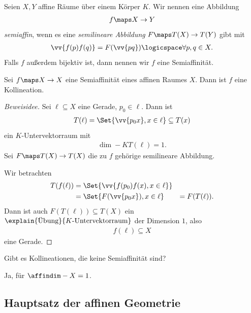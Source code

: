 \begin{definition*}
    Seien \( X,Y \) affine Räume über einem Körper \( K \). Wir nennen eine Abbildung
    \begin{align*}
        f\maps X\to Y
    \end{align*}
    \emph{semiaffin}, wenn es eine \emph{semilineare Abbildung} \( F\maps T(X)\to T(Y) \) gibt mit
    \begin{align*}
        \vv{f(p) f(q)}=F(\vv{pq})\logicspace \forall p,q\in X.
    \end{align*}
    Falls \( f \) außerdem bijektiv ist, dann nennen wir \( f \) eine Semiaffinität.
\end{definition*}
\begin{lemma}
    Sei \( f\maps X\to X \) eine Semiaffinität eines affinen Raumes \( X \). Dann ist \( f \) eine Kollineation.
\end{lemma}
\begin{proof}[Beweisidee]
    Sei \( \ell \subseteq X \) eine Gerade, \( p_0\in \ell \). Dann ist
    \begin{align*}
        T(\ell)=\Set{\vv{p_0 x}, x\in \ell}\subseteq T(x)
    \end{align*}
    ein \( K \)-Untervektorraum mit
    \begin{align*}
        \dim-{K}{T(\ell)}=1.
    \end{align*}
    Sei \( F\maps T(X)\to T(X)  \) die zu \( f \) gehörige semilineare Abbildung.

    Wir betrachten 
    \begin{align*}
        T(f(\ell))
        \begin{aligned}[t]
            &=\Set{\vv{f(p_0) f(x), x\in \ell}}\\
            &=\Set{F(\vv{p_0 x}), x\in \ell}
            &=F(T(\ell)).
        \end{aligned}        
    \end{align*}
    Dann ist auch \( F(T(\ell))\subseteq T(X) \) ein \( \explain{\text{Übung}}{K \text{-Untervektorraum}} \) der Dimension \( 1 \), also
    \begin{align*}
        f(\ell)\subseteq X
    \end{align*}
    eine Gerade.
\end{proof}
\begin{frage*}
    Gibt es Kollineationen, die keine Semiaffinität sind?
\end{frage*}
\tto Ja, \zb für \( \affindim-{X}=1 \).
\subsection*{Hauptsatz der affinen Geometrie}

